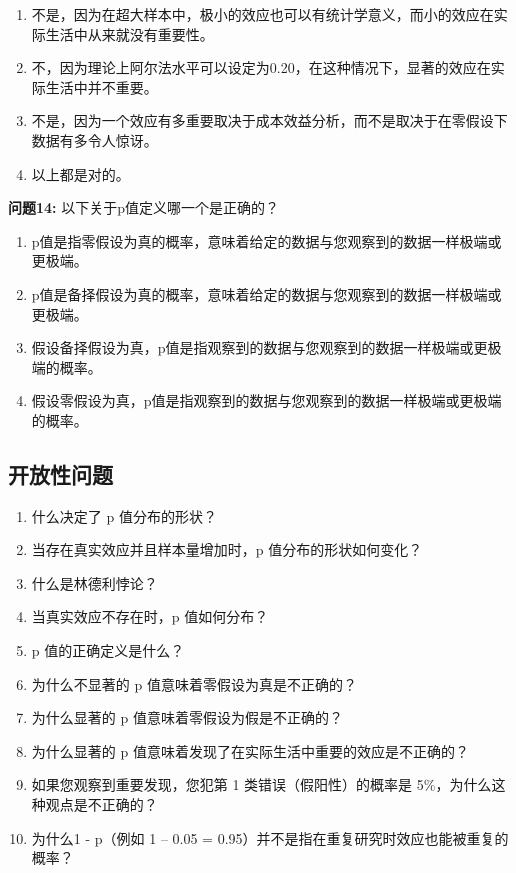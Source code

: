\documentclass[
  letterpaper,
  DIV=11,
  numbers=noendperiod]{scrreprt}
\providecommand{\tightlist}{%
  \setlength{\itemsep}{0pt}\setlength{\parskip}{0pt}}\usepackage{longtable,booktabs,array}
\begin{document}
\begin{enumerate}
\def\labelenumi{\Alph{enumi})}
\tightlist
\item
  不是，因为在超大样本中，极小的效应也可以有统计学意义，而小的效应在实际生活中从来就没有重要性。
\item
  不，因为理论上阿尔法水平可以设定为0.20，在这种情况下，显著的效应在实际生活中并不重要。
\item
  不是，因为一个效应有多重要取决于成本效益分析，而不是取决于在零假设下数据有多令人惊讶。
\item
  以上都是对的。
\end{enumerate}

\textbf{问题14:} 以下关于p值定义哪一个是正确的？

\begin{enumerate}
\def\labelenumi{\Alph{enumi})}
\tightlist
\item
  p值是指零假设为真的概率，意味着给定的数据与您观察到的数据一样极端或更极端。
\item
  p值是备择假设为真的概率，意味着给定的数据与您观察到的数据一样极端或更极端。
\item
  假设备择假设为真，p值是指观察到的数据与您观察到的数据一样极端或更极端的概率。
\item
  假设零假设为真，p值是指观察到的数据与您观察到的数据一样极端或更极端的概率。
\end{enumerate}

\hypertarget{ux5f00ux653eux6027ux95eeux9898}{%
\subsection{开放性问题}\label{ux5f00ux653eux6027ux95eeux9898}}

\begin{enumerate}
\def\labelenumi{\arabic{enumi}.}
\item
  什么决定了 p 值分布的形状？
\item
  当存在真实效应并且样本量增加时，p 值分布的形状如何变化？
\item
  什么是林德利悖论？
\item
  当真实效应不存在时，p 值如何分布？
\item
  p 值的正确定义是什么？
\item
  为什么不显著的 p 值意味着零假设为真是不正确的？
\item
  为什么显著的 p 值意味着零假设为假是不正确的？
\item
  为什么显著的 p 值意味着发现了在实际生活中重要的效应是不正确的？
\item
  如果您观察到重要发现，您犯第 1 类错误（假阳性）的概率是
  5\%，为什么这种观点是不正确的？
\item
  为什么1 - p（例如 1 -- 0.05 =
  0.95）并不是指在重复研究时效应也能被重复的概率？
\end{enumerate}
\end{document}
